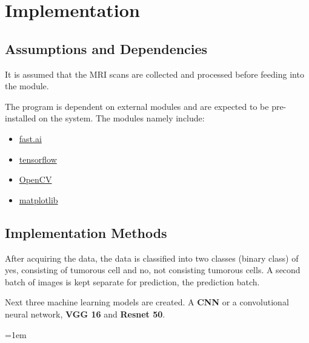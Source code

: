 \documentclass[11pt]{article}
\begin{document}
	\section[implementation]{Implementation}

	\subsection{Assumptions and Dependencies}%
	\label{sub:Assumptions and Dependencies}
	It is assumed that the MRI scans are collected and processed before feeding
	into the module.

	The program is dependent on external modules and are expected to be
	pre-installed on the system. The modules namely include:

	\begin{itemize}
		\item \href{https://www.fast.ai/}{fast.ai}
		\item \href{https://www.tensorflow.org/}{tensorflow}
		\item \href{https://opencv.org/}{OpenCV}
		\item \href{https://matplotlib.org/}{matplotlib}
	\end{itemize}

	\subsection{Implementation Methods}%
	\label{sub:Implementation Methods}
	After acquiring the data, the data is classified into two classes (binary
	class) of yes, consisting of tumorous cell and no, not consisting tumorous
	cells. A second batch of images is kept separate for prediction, the
	prediction batch.

	Next three machine learning models are created. A \textbf{CNN} or a
	convolutional neural network, \textbf{VGG 16} and \textbf{Resnet 50}.

	\emergencystretch=1em
	\printbibliography[heading=bibintoc,title={References}]
\end{document}
